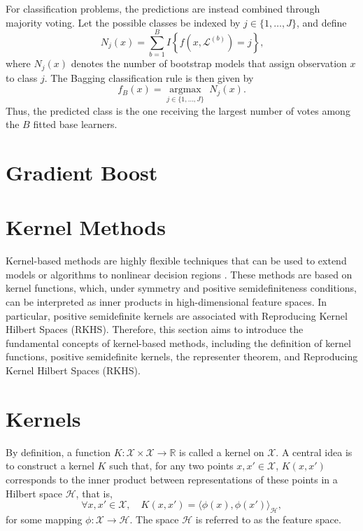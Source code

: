 For classification problems, the predictions are instead combined through majority voting. Let the possible classes be indexed by
$j\in\{1,\ldots,J\}$, and define
\begin{equation}
N_j(x) = \sum_{b=1}^{B} I\left\{ f\left(x,\mathcal{L}^{(b)}\right)=j \right\}\text{,}
\end{equation}
where $N_j(x)$ denotes the number of bootstrap models that assign
observation $x$ to class $j$. The Bagging classification rule is then
given by
\begin{equation}
\label{eq:bagging_classification}
f_B(x)
=
\underset{j\in\{1,\ldots,J\}}{\operatorname{argmax}}
\;N_j(x).
\end{equation}
Thus, the predicted class is the one receiving the largest number of votes
among the $B$ fitted base learners.


\section{Gradient Boost}

\section{Kernel Methods}

\noindent Kernel-based methods are highly flexible techniques that can be used
to extend models or algorithms to nonlinear decision regions \cite{mohri2018foundations}.
These methods are based on kernel functions, which, under symmetry and
positive semidefiniteness conditions, can be interpreted as inner products
in high-dimensional feature spaces. In particular, positive semidefinite
kernels are associated with Reproducing Kernel Hilbert Spaces (RKHS).
Therefore, this section aims to introduce the fundamental concepts of
kernel-based methods, including the definition of kernel functions, positive
semidefinite kernels, the representer theorem, and Reproducing Kernel Hilbert
Spaces (RKHS).

\section{Kernels}

By definition, a function $K: \mathcal{X} \times \mathcal{X} \to \mathbb{R}$
is called a kernel on $\mathcal{X}$. A central idea is to construct a kernel
$K$ such that, for any two points $x, x' \in \mathcal{X}$,
$K(x,x')$ corresponds to the inner product between representations of these
points in a Hilbert space $\mathcal{H}$, that is,
\begin{equation}
\forall x, x' \in \mathcal{X}, \quad
K(x,x') = \langle \phi(x), \phi(x') \rangle_{\mathcal{H}},
\end{equation}
for some mapping $\phi: \mathcal{X} \to \mathcal{H}$. The space
$\mathcal{H}$ is referred to as the feature space.

